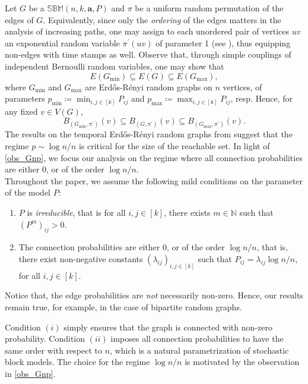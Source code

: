 \documentclass[11pt]{article}
\numberwithin{equation}{section}
\theoremstyle{definition}
\newcommand\bB{{\mathbb B}}
\newcommand\bM{{\mathbb M}}
\newcommand\bS{{\mathbb S}}
\begin{document}
Let $G$ be a $\bS\bB\bM(n,k,\boldsymbol{a},P)$ and $\pi$ be a uniform random permutation of the edges of $G$. Equivalently, since only the \emph{ordering} of the edges matters in the analysis of increasing paths, one may assign to each unordered pair of vertices $uv$ an exponential random variable $\pi^\prime(uv)$ of parameter 1 (see \cite{CRRZ24}), thus equipping non-edges with time stamps as well. Observe that, through simple couplings of independent Bernoulli random variables, one may show that 
$$E(G_{\min}) \subseteq E(G) \subseteq E(G_{\max}), $$
where $G_{\min}$ and $G_{\max}$ are Erd\H os-R\'enyi random graphs on $n$ vertices, of parameters $p_{\min} \coloneqq \min_{i,j\in [k]}P_{ij}$ and $p_{\max}\coloneqq \max_{i,j\in [k]}P_{ij}$, resp. Hence, for any fixed $v \in V(G)$,
\begin{equation}
\label{obs_Gnp}
B_{(G_{\min},\pi^\prime)}(v) \subseteq B_{(G,\pi^\prime)}(v) \subseteq B_{(G_{\max},\pi^\prime)}(v).
\end{equation}
The results on the temporal Erd\H os-R\'enyi random graphs from \cite{BKL24} suggest that the regime $p\sim \log n/n$ is critical for the size of the reachable set. In light of \eqref{obs_Gnp}, we focus our analysis on the regime where all connection probabilities are either 0, or of the order $\log n/n$.\\

Throughout the paper, we assume the following mild conditions on the parameter of the model $P$:
\begin{enumerate}[label = (\roman*)]
	\item \label{ass1} $P$ is \emph{irreducible}, that is for all $i,j \in [k]$, there exists $m \in \mathbb{N}$ such that $(P^m)_{ij} > 0$.
	\item \label{ass2} The connection probabilities are either 0, or of the order $\log n/n$, that is, there exist non-negative constants $(\lambda_{ij})_{i,j\in [k]}$ such that $P_{ij} = \lambda_{ij}\log n/n$, for all $i,j \in [k]$.
\end{enumerate}
Notice that, the edge probabilities are \emph{not} necessarily non-zero. Hence, our results remain true, for example, in the case of bipartite random graphs.

Condition $(i)$ simply ensures that the graph is connected with non-zero probability. Condition $(ii)$ imposes all connection probabilities to have the same order with respect to $n$, which is a natural parametrization of stochastic block models. The choice for the regime $\log n/n$ is motivated by the observation in \eqref{obs_Gnp}.  
\end{document}
